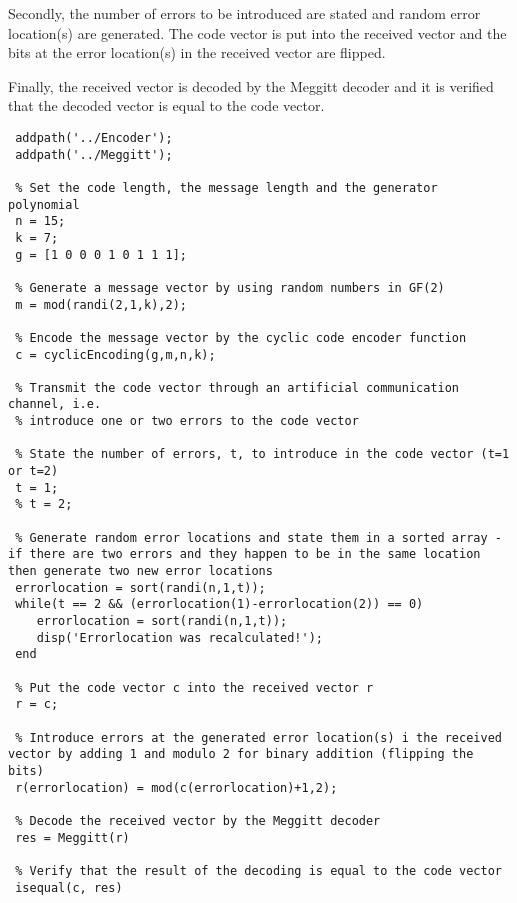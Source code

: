 \documentclass[Main]{subfiles}
\begin{document}
\noindent Secondly, the number of errors to be introduced are stated and random error location(s) are generated. The code vector is put into the received vector and the bits at the error location(s) in the received vector are flipped. 

\noindent Finally, the received vector is decoded by the Meggitt decoder and it is verified that the decoded vector is equal to the code vector.    

\begin{lstlisting}[caption=Main Function, style=Code-Matlab, label=lst:refID]
 % This code makes use of the cyclic encoder and the Meggitt decoder 
 addpath('../Encoder');
 addpath('../Meggitt');

 % Set the code length, the message length and the generator polynomial
 n = 15;
 k = 7;
 g = [1 0 0 0 1 0 1 1 1];

 % Generate a message vector by using random numbers in GF(2)
 m = mod(randi(2,1,k),2);

 % Encode the message vector by the cyclic code encoder function
 c = cyclicEncoding(g,m,n,k);

 % Transmit the code vector through an artificial communication channel, i.e.
 % introduce one or two errors to the code vector 

 % State the number of errors, t, to introduce in the code vector (t=1 or t=2)
 t = 1;
 % t = 2;

 % Generate random error locations and state them in a sorted array - if there are two errors and they happen to be in the same location then generate two new error locations
 errorlocation = sort(randi(n,1,t)); 
 while(t == 2 && (errorlocation(1)-errorlocation(2)) == 0)
    errorlocation = sort(randi(n,1,t));
    disp('Errorlocation was recalculated!');
 end

 % Put the code vector c into the received vector r
 r = c;

 % Introduce errors at the generated error location(s) i the received vector by adding 1 and modulo 2 for binary addition (flipping the bits)
 r(errorlocation) = mod(c(errorlocation)+1,2);

 % Decode the received vector by the Meggitt decoder
 res = Meggitt(r)

 % Verify that the result of the decoding is equal to the code vector
 isequal(c, res)
\end{lstlisting}
\end{document}
